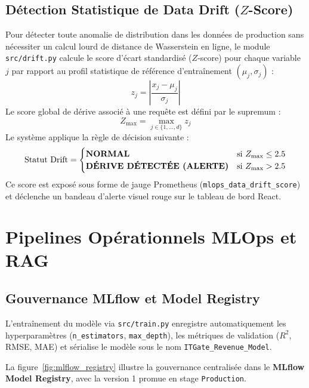 \documentclass[11pt,a4paper,oneside]{report}
\begin{document}
\subsection{Détection Statistique de Data Drift ($Z$-Score)}
Pour détecter toute anomalie de distribution dans les données de production sans nécessiter un calcul lourd de distance de Wasserstein en ligne, le module \texttt{src/drift.py} calcule le score d'écart standardisé ($Z$-score) pour chaque variable $j$ par rapport au profil statistique de référence d'entraînement $(\mu_j, \sigma_j)$ :
\begin{equation}
    z_j = \left| \frac{x_j - \mu_j}{\sigma_j} \right|
\end{equation}
Le score global de dérive associé à une requête est défini par le supremum :
\begin{equation}
    Z_{\text{max}} = \max_{j \in \{1,\dots,d\}} z_j
\end{equation}
Le système applique la règle de décision suivante :
\begin{equation}
    \text{Statut Drift} = 
    \begin{cases} 
        \text{\textbf{NORMAL}} & \text{si } Z_{\text{max}} \le 2.5 \\ 
        \text{\textbf{DÉRIVE DÉTECTÉE (ALERTE)}} & \text{si } Z_{\text{max}} > 2.5 
    \end{cases}
\end{equation}
Ce score est exposé sous forme de jauge Prometheus (\texttt{mlops\_data\_drift\_score}) et déclenche un bandeau d'alerte visuel rouge sur le tableau de bord React.

\section{Pipelines Opérationnels MLOps et RAG}

\subsection{Gouvernance MLflow et Model Registry}
L'entraînement du modèle via \texttt{src/train.py} enregistre automatiquement les hyperparamètres (\texttt{n\_estimators}, \texttt{max\_depth}), les métriques de validation ($R^2$, RMSE, MAE) et sérialise le modèle sous le nom \texttt{ITGate\_Revenue\_Model}. 

La figure~\ref{fig:mlflow_registry} illustre la gouvernance centralisée dans le \textbf{MLflow Model Registry}, avec la version 1 promue en stage \texttt{Production}.
\end{document}
